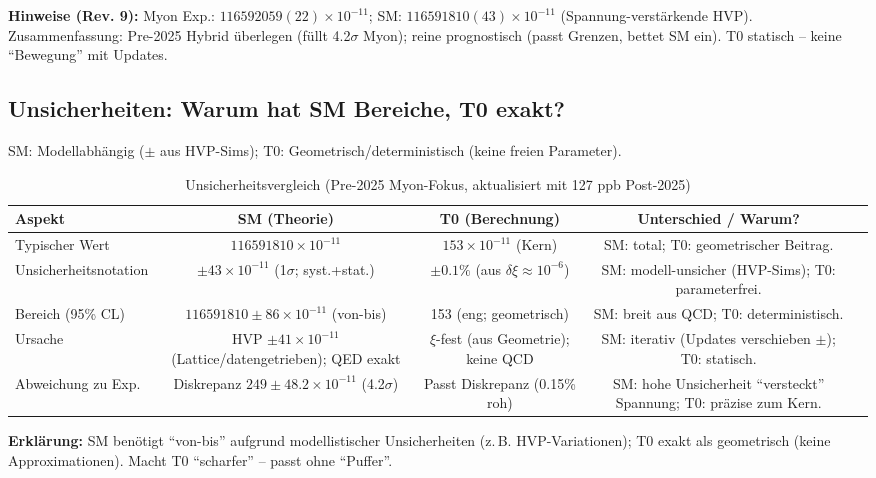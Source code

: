 \documentclass[12pt,a4paper]{article}
\theoremstyle{definition}
\begin{document}
	\textbf{Hinweise (Rev. 9):} Myon Exp.: $116592059(22) \times 10^{-11}$; SM: $116591810(43) \times 10^{-11}$ (Spannung-verstärkende HVP). Zusammenfassung: Pre-2025 Hybrid überlegen (füllt 4.2$\sigma$ Myon); reine prognostisch (passt Grenzen, bettet SM ein). T0 statisch -- keine ``Bewegung'' mit Updates.
	
	\subsection{Unsicherheiten: Warum hat SM Bereiche, T0 exakt?}
	
	SM: Modellabhängig ($\pm$ aus HVP-Sims); T0: Geometrisch/deterministisch (keine freien Parameter).
	
	\begin{table}[ht!]
		\centering
		\small
		\begin{adjustbox}{max width=\textwidth}
			\begin{tabular}{@{}lcccr@{}}
				\toprule
				Aspekt & SM (Theorie) & T0 (Berechnung) & Unterschied / Warum? \\
				\midrule
				Typischer Wert & $116591810 \times 10^{-11}$ & $153 \times 10^{-11}$ (Kern) & SM: total; T0: geometrischer Beitrag. \\
				Unsicherheitsnotation & $\pm 43 \times 10^{-11}$ (1$\sigma$; syst.+stat.) & $\pm 0.1\%$ (aus $\delta\xi \approx 10^{-6}$) & SM: modell-unsicher (HVP-Sims); T0: parameterfrei. \\
				Bereich (95\% CL) & $116591810 \pm 86 \times 10^{-11}$ (von-bis) & 153 (eng; geometrisch) & SM: breit aus QCD; T0: deterministisch. \\
				Ursache & HVP $\pm 41 \times 10^{-11}$ (Lattice/datengetrieben); QED exakt & $\xi$-fest (aus Geometrie); keine QCD & SM: iterativ (Updates verschieben $\pm$); T0: statisch. \\
				Abweichung zu Exp. & Diskrepanz $249 \pm 48.2 \times 10^{-11}$ (4.2$\sigma$) & Passt Diskrepanz (0.15\% roh) & SM: hohe Unsicherheit ``versteckt'' Spannung; T0: präzise zum Kern. \\
				\bottomrule
			\end{tabular}
		\end{adjustbox}
		\caption{Unsicherheitsvergleich (Pre-2025 Myon-Fokus, aktualisiert mit 127 ppb Post-2025)}
		\label{tab:uncertainties}
	\end{table}
	
	\textbf{Erklärung:} SM benötigt ``von-bis'' aufgrund modellistischer Unsicherheiten (z.\,B. HVP-Variationen); T0 exakt als geometrisch (keine Approximationen). Macht T0 ``scharfer'' -- passt ohne ``Puffer''.
	
\end{document}

